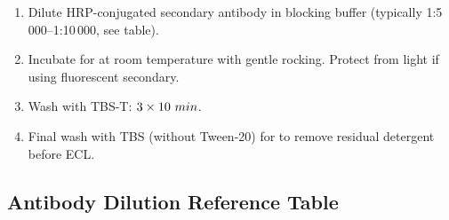 \begin{enumerate}
  \item Dilute HRP-conjugated secondary antibody in blocking buffer (typically
        1:5\,000--1:10\,000, see table).
  \item Incubate for  at room temperature with gentle rocking.
        Protect from light if using fluorescent secondary.
  \item Wash with TBS-T: $3 \times 10~min$.
  \item Final wash with TBS (without Tween-20) for  to remove
        residual detergent before ECL.
\end{enumerate}

\subsection{Antibody Dilution Reference Table}

